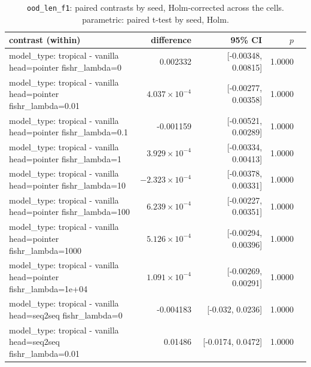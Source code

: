 \documentclass[10pt]{article}
\makeatletter
\newcommand{\stackcell}[1]{\begin{tabular}[t]{@{}l@{}}#1\end{tabular}}
\makeatother
\begin{document}
{\small
\begin{longtable}{lrrrl}
\caption{\texttt{ood\_len\_f1}: paired contrasts by seed, Holm-corrected across the cells. parametric: paired t-test by seed, Holm.}\label{tab:paired-ood_len_f1}\\
\toprule
contrast (within) & difference & 95\% CI & $p$ & \\
\midrule
\endhead
\stackcell{model\_type: tropical - vanilla\\\footnotesize head=pointer fishr\_lambda=0 } & 0.002332 & [-0.00348, 0.00815] & 1.0000 & \\
\stackcell{model\_type: tropical - vanilla\\\footnotesize head=pointer fishr\_lambda=0.01 } & $4.037\times10^{-4}$ & [-0.00277, 0.00358] & 1.0000 & \\
\stackcell{model\_type: tropical - vanilla\\\footnotesize head=pointer fishr\_lambda=0.1 } & -0.001159 & [-0.00521, 0.00289] & 1.0000 & \\
\stackcell{model\_type: tropical - vanilla\\\footnotesize head=pointer fishr\_lambda=1 } & $3.929\times10^{-4}$ & [-0.00334, 0.00413] & 1.0000 & \\
\stackcell{model\_type: tropical - vanilla\\\footnotesize head=pointer fishr\_lambda=10 } & $-2.323\times10^{-4}$ & [-0.00378, 0.00331] & 1.0000 & \\
\stackcell{model\_type: tropical - vanilla\\\footnotesize head=pointer fishr\_lambda=100 } & $6.239\times10^{-4}$ & [-0.00227, 0.00351] & 1.0000 & \\
\stackcell{model\_type: tropical - vanilla\\\footnotesize head=pointer fishr\_lambda=1000 } & $5.126\times10^{-4}$ & [-0.00294, 0.00396] & 1.0000 & \\
\stackcell{model\_type: tropical - vanilla\\\footnotesize head=pointer fishr\_lambda=1e+04 } & $1.091\times10^{-4}$ & [-0.00269, 0.00291] & 1.0000 & \\
\stackcell{model\_type: tropical - vanilla\\\footnotesize head=seq2seq fishr\_lambda=0 } & -0.004183 & [-0.032, 0.0236] & 1.0000 & \\
\stackcell{model\_type: tropical - vanilla\\\footnotesize head=seq2seq fishr\_lambda=0.01 } & 0.01486 & [-0.0174, 0.0472] & 1.0000 & \\

\end{longtable}}
\end{document}
